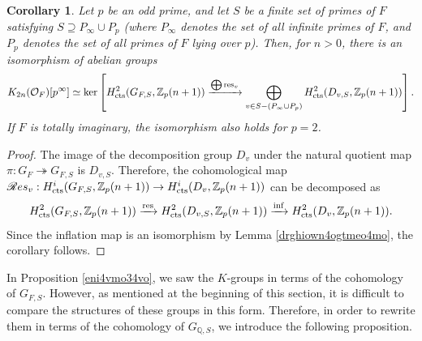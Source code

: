 \documentclass{article}
\numberwithin{equation}{section} %
\newtheorem{cor}[lemm]{Corollary}
\begin{document}
        \begin{cor}
        \label{segfunwntomnto4t}
  Let $p$ be an odd prime, and let $S$ be a finite set of primes of $F$ satisfying $S \supseteq P_\infty \cup P_p$ (where $P_\infty$ denotes the set of all infinite primes of $F$, and $P_p$ denotes the set of all primes of $F$ lying over $p$). Then, for $n > 0$, there is an isomorphism of abelian groups
  \[
    K_{2n}(\mathcal{O}_F)[p^\infty] \simeq \operatorname{ker}\left[H^2_{\rm cts}(G_{F,S}, \mathbb{Z}_p(n+1)) \xrightarrow{\bigoplus \mathrm{res}_v} \bigoplus_{v \in S - (P_\infty \cup P_p)}H^2_{\rm cts}(D_{v,S}, \mathbb{Z}_p(n+1))\right].
  \]
  If $F$ is totally imaginary, the isomorphism also holds for $p=2$.
\end{cor}

\begin{proof}
    The image of the decomposition group $D_v$ under the natural quotient map $\pi: G_F \twoheadrightarrow G_{F,S}$ is $D_{v,S}$. Therefore, the cohomological map $\mathscr{R}es_v: H_{\rm cts}^i(G_{F,S},\mathbb{Z}_p(n+1)) \to H_{\rm cts}^i(D_v,\mathbb{Z}_p(n+1))$ can be decomposed as
    \[ H^2_{\rm cts}(G_{F,S},\mathbb{Z}_p(n+1)) \xrightarrow{\rm res} H^2_{\rm cts}(D_{v,S},\mathbb{Z}_p(n+1)) \xrightarrow{\rm inf} H^2_{\rm cts}(D_v,\mathbb{Z}_p(n+1)).\]
    Since the inflation map is an isomorphism by Lemma \ref{drghiown4ogtmeo4mo}, the corollary follows.
\end{proof}

  In Proposition \ref{eni4vmo34vo}, we saw the $K$-groups in terms of the cohomology of $G_{F,S}$. However, as mentioned at the beginning of this section, it is difficult to compare the structures of these groups in this form. Therefore, in order to rewrite them in terms of the cohomology of $G_{\mathbb{Q},S}$, we introduce the following proposition.
          
\end{document}
